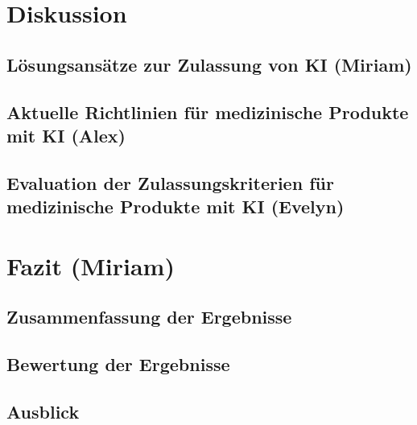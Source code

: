 \documentclass[a4paper, 11pt]{article}
\begin{document}
	\section{Diskussion}\label{sec:discussion}
		
		\subsection{Lösungsansätze zur Zulassung von KI  \small{(Miriam)}} \label{sec:solutions}
			
		\subsection{Aktuelle Richtlinien für medizinische Produkte mit KI \small{(Alex)}}\label{sec:guidlines}
			
		\subsection{Evaluation der Zulassungskriterien für medizinische Produkte mit KI \small{(Evelyn)}}\label{sec:sufficient-criteria}
			
		
	
	\newpage
	\section{Fazit \small{(Miriam)}}\label{sec:conclusion}
		
		\subsection{Zusammenfassung der Ergebnisse}\label{sec:summary}
			
		\subsection{Bewertung der Ergebnisse}\label{sec:rating}
			
		\subsection{Ausblick}\label{sec:perspective}
			
	  

    \newpage
    \printglossary[type=\acronymtype,title={Akronyme}]
   
    \newpage
    \nocite{*}
    \printbibliography[heading=bibintoc,type=article, title={Literatur}]
	
    \newpage
    \printglossary[type=main,title={Glossar}]
\end{document}
